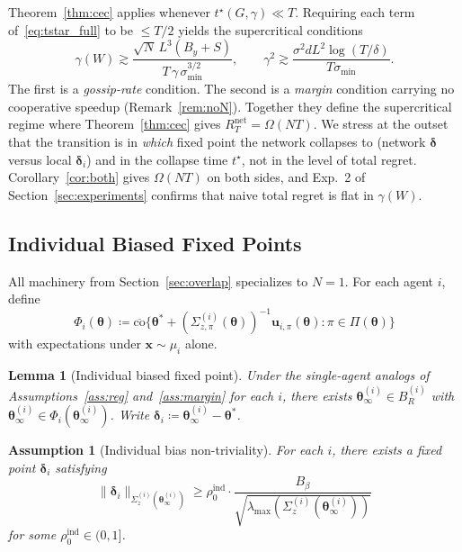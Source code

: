 \documentclass[11pt]{article}
\newtheorem{lemma}[theorem]{Lemma}
\newtheorem{assumption}[theorem]{Assumption}
\begin{document}
Theorem~\ref{thm:cec} applies whenever $t^\star(G,\gamma)\ll T$.
Requiring each term of~\eqref{eq:tstar_full} to be
$\leq T/2$ yields the supercritical conditions
\begin{equation}
\gamma(W)\gtrsim\frac{\sqrt{N}\,L^3(B_y+S)}{T\,\gamma\,\sigma_{\min}^{3/2}},\qquad
\gamma^2\gtrsim\frac{\sigma^2 dL^2\log(T/\delta)}{T\sigma_{\min}}.
\label{eq:phase}
\end{equation}
The first is a \emph{gossip-rate} condition. The second is a
\emph{margin} condition carrying no cooperative speedup
(Remark~\ref{rem:noN}).  Together they define the supercritical regime
where Theorem~\ref{thm:cec} gives $R_T^{\mathrm{net}}=\Omega(NT)$.
We stress at the outset that the transition is in \emph{which} fixed
point the network collapses to (network $\bm\delta$ versus local
$\bm\delta_i$) and in the collapse time $t^\star$, not in the level of
total regret. Corollary~\ref{cor:both} gives $\Omega(NT)$ on both
sides, and Exp.~2 of Section~\ref{sec:experiments} confirms that naive
total regret is flat in $\gamma(W)$.

\subsection{Individual Biased Fixed Points}\label{sec:indiv}

All machinery from Section~\ref{sec:overlap} specializes to $N=1$.
For each agent $i$, define
\[
\Phi_i(\bm{\theta})\coloneqq
\overline{\mathrm{co}}\bigl\{
\bm{\theta}^{\!*}+(\Sigma_{z,\pi}^{(i)}(\bm{\theta}))^{-1}
\bm{u}_{i,\pi}(\bm{\theta}):\pi\in\Pi(\bm{\theta})\bigr\}
\]
with expectations under $\bm{x}\sim\mu_i$ alone.

\begin{lemma}[Individual biased fixed point]\label{lem:fp_ind}
Under the single-agent analogs of Assumptions~\ref{ass:reg}
and~\ref{ass:margin} for each $i$,
there exists $\bm{\theta}_\infty^{(i)}\in B_R^{(i)}$ with
$\bm{\theta}_\infty^{(i)}\in\Phi_i(\bm{\theta}_\infty^{(i)})$.
Write $\bm{\delta}_i\coloneqq\bm{\theta}_\infty^{(i)}-\bm{\theta}^{\!*}$.
\end{lemma}

\begin{assumption}[Individual bias non-triviality]\label{ass:bias_ind}
For each $i$, there exists a fixed point $\bm{\delta}_i$ satisfying
\[
\|\bm{\delta}_i\|_{\Sigma_z^{(i)}(\bm{\theta}_\infty^{(i)})}
\geq\rho_0^{\mathrm{ind}}\cdot
\frac{B_\beta}{\sqrt{\lambda_{\max}(\Sigma_z^{(i)}(\bm{\theta}_\infty^{(i)}))}}
\]
for some $\rho_0^{\mathrm{ind}}\in(0,1]$.
\end{assumption}
\end{document}
